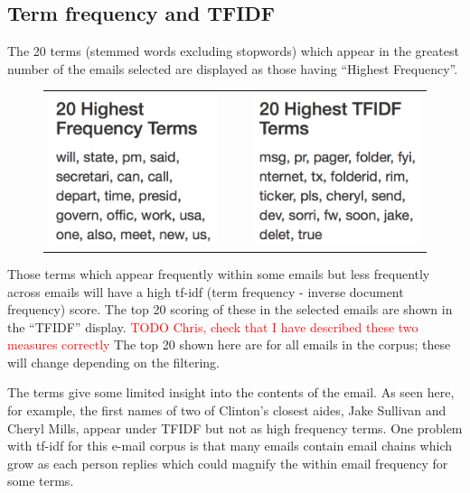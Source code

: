 \documentclass[journal]{vgtc}                %
\newcommand*{\TODO}[1]{\textcolor{red}{TODO #1}}
\begin{document}
\subsection{Term frequency and TFIDF}
\label{sect:Displays:TFIDF}
The 20 terms (stemmed words excluding stopwords) which appear in the greatest number of the emails selected are displayed as those having ``Highest Frequency''.  
\begin{figure}[h]
\begin{center}
\begin{tabular}{ccc}
\includegraphics[width=0.4\linewidth]{HighFreqAll} &
$~~~~$ &
\includegraphics[width=0.4\linewidth]{HighTFIDFAll} 
\end{tabular}
\end{center}
\end{figure}
Those terms which appear frequently within some emails but less frequently across emails will have a high tf-idf (term frequency - inverse document frequency) score.  The top 20 scoring of these in the selected emails are shown in the ``TFIDF'' display. \TODO{Chris, check that I have described these two measures correctly}
The top 20 shown here are for all emails in the corpus; these will change depending on the filtering.

The terms give some limited insight into the contents of the email.  As seen here, for example, the first names of two of Clinton's closest aides, Jake Sullivan and Cheryl Mills,  appear under TFIDF but not  as high frequency terms.  One problem with tf-idf for this e-mail corpus is that many emails contain email chains which grow as each person replies which could magnify the within email frequency for some terms.
\end{document}
